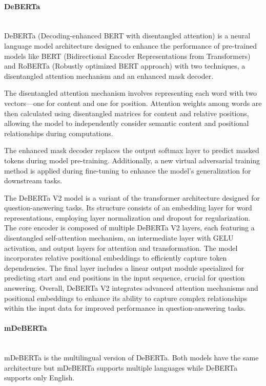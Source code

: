 \documentclass[12pt,oneside,openright,a4paper]{cpe-english-project}
\begin{document}
        \paragraph{DeBERTa}\mbox{}\\
          \null\qquad DeBERTa (Decoding-enhanced BERT with disentangled attention) is a neural language model architecture designed to enhance the performance of pre-trained models like BERT (Bidirectional Encoder Representations from Transformers) and RoBERTa (Robustly optimized BERT approach) with two techniques, a disentangled attention mechanism and an enhanced mask decoder.\par
          \qquad The disentangled attention mechanism involves representing each word with two vectors—one for content and one for position. Attention weights among words are then calculated using disentangled matrices for content and relative positions, allowing the model to independently consider semantic content and positional relationships during computations.\par
          \qquad The enhanced mask decoder replaces the output softmax layer to predict masked tokens during model pre-training. Additionally, a new virtual adversarial training method is applied during fine-tuning to enhance the model's generalization for downstream tasks.\par
          \qquad The DeBERTa V2 model is a variant of the transformer architecture designed for question-answering tasks. Its structure consists of an embedding layer for word representations, employing layer normalization and dropout for regularization. The core encoder is composed of multiple DeBERTa V2 layers, each featuring a disentangled self-attention mechanism, an intermediate layer with GELU activation, and output layers for attention and transformation. The model incorporates relative positional embeddings to efficiently capture token dependencies. The final layer includes a linear output module specialized for predicting start and end positions in the input sequence, crucial for question answering. Overall, DeBERTa V2 integrates advanced attention mechanisms and positional embeddings to enhance its ability to capture complex relationships within the input data for improved performance in question-answering tasks.\cite{deberta1,deberta2}\par
  
        \paragraph{mDeBERTa}\mbox{}\\
          \null\qquad mDeBERTa\cite{huggingface1} is the multilingual version of DeBERTa. Both models have the same architecture but mDeBERTa supports multiple languages while DeBERTa supports only English.\par
      
\end{document}

